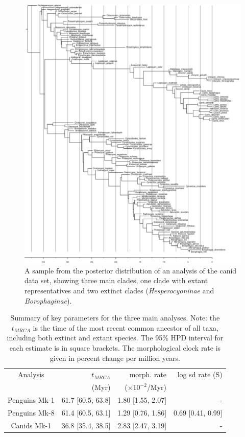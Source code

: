 \documentclass[11pt]{article}
\begin{document}
\begin{figure}
\includegraphics[width=15cm]{canids/stratRanges/1_canids_ranges_3_subset-1460502871266-tree10001.pdf}
\caption{\label{fig:canidTree} A sample from the posterior distribution of an analysis of the canid data set, 
showing three main clades, one clade with extant representatives and two extinct clades ({\it Hesperocyoninae} and {\it Borophaginae}).}
\end{figure}

\begin{table}[ht]
\centering
\begin{tabular}{c|rrr}
  \hline
Analysis & $t_{MRCA}$ & morph. rate  & log sd rate (S) \\ 
 & (Myr) & ($\times 10^{-2}$/Myr) & \\
  \hline
Penguins Mk-1 & 61.7 [60.5, 63.8] & 1.80 [1.55, 2.07] & -  \\
Penguins Mk-8 & 61.4 [60.5, 63.1] & 1.29 [0.76, 1.86] & 0.69 [0.41, 0.99] \\
  \hline
Canids Mk-1 &  36.8 [35.4, 38.5] & 2.83 [2.47, 3.19] & - \\
\hline
  \end{tabular}
\caption{Summary of key parameters for the three main analyses. Note: the $t_{MRCA}$ is the time of the most recent common ancestor of all taxa, including both extinct and extant species. The 95\% HPD interval for each estimate is in square brackets. The morphological clock rate is given in percent change per million years.} 
\label{estimatesTable}
\end{table}
\end{document}
